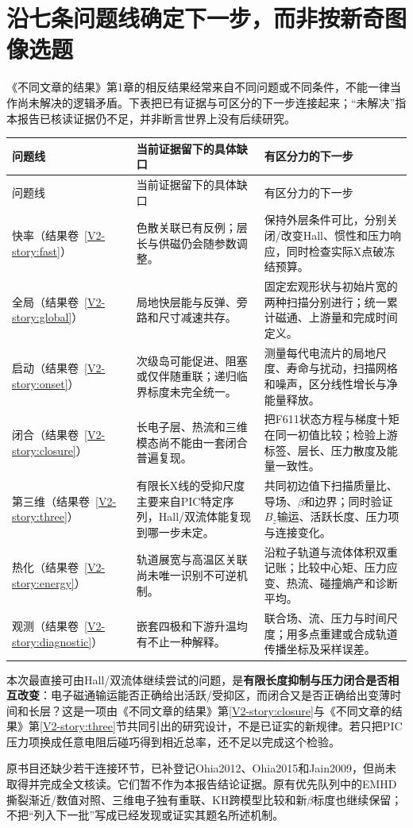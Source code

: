 \documentclass[UTF8,a4paper,11pt,openany,fontset=fandol]{ctexbook}
\begin{document}
\section{沿七条问题线确定下一步，而非按新奇图像选题}
《不同文章的结果》第1章的相反结果经常来自不同问题或不同条件，不能一律当作尚未解决的逻辑矛盾。下表把已有证据与可区分的下一步连接起来；“未解决”指本报告已核读证据仍不足，并非断言世界上没有后续研究。
\begin{longtable}{P{25mm}P{55mm}P{66mm}}
\toprule 问题线 & 当前证据留下的具体缺口 & 有区分力的下一步\\\midrule\endfirsthead
\toprule 问题线 & 当前证据留下的具体缺口 & 有区分力的下一步\\\midrule\endhead
快率（结果卷~\ref{V2-story:fast}） &
色散关联已有反例；层长与供磁仍会随参数调整。 &
保持外层条件可比，分别关闭/改变Hall、惯性和压力响应，同时检查实际X点破冻结预算。\\
全局（结果卷~\ref{V2-story:global}） &
局地快层能与反弹、旁路和尺寸减速共存。 &
固定宏观形状与初始片宽的两种扫描分别进行；统一累计磁通、上游量和完成时间定义。\\
启动（结果卷~\ref{V2-story:onset}） &
次级岛可能促进、阻塞或仅伴随重联；递归临界标度未完全统一。 &
测量每代电流片的局地尺度、寿命与扰动，扫描网格和噪声，区分线性增长与净能量释放。\\
闭合（结果卷~\ref{V2-story:closure}） &
长电子层、热流和三维模态尚不能由一套闭合普遍复现。 &
把F611状态方程与梯度十矩在同一初值比较；检验上游标签、层长、压力散度及能量一致性。\\
第三维（结果卷~\ref{V2-story:three}） &
有限长X线的受抑尺度主要来自PIC特定序列，Hall/双流体能复现到哪一步未定。 &
共同初边值下扫描质量比、导场、$\beta$和边界；同时验证$B_z$输运、活跃长度、压力项与连接变化。\\
热化（结果卷~\ref{V2-story:energy}） &
轨道展宽与高温区关联尚未唯一识别不可逆机制。 &
沿粒子轨道与流体体积双重记账；比较中心矩、压力应变、热流、碰撞熵产和诊断平均。\\
观测（结果卷~\ref{V2-story:diagnostic}） &
嵌套四极和下游升温均有不止一种解释。 &
联合场、流、压力与时间尺度；用多点重建或合成轨道传播坐标及采样误差。\\
\bottomrule
\end{longtable}

本次最直接可由Hall/双流体继续尝试的问题，是\textbf{有限长度抑制与压力闭合是否相互改变}：电子磁通输运能否正确给出活跃/受抑区，而闭合又是否正确给出变薄时间和长层？这是一项由《不同文章的结果》第\ref{V2-story:closure}与《不同文章的结果》第\ref{V2-story:three}节共同引出的研究设计，不是已证实的新规律。若只把PIC压力项换成任意电阻后碰巧得到相近总率，还不足以完成这个检验。\citep{F611,F659,F792}

原书目还缺少若干连接环节，已补登记Ohia2012、Ohia2015和Jain2009，但尚未取得并完成全文核读。它们暂不作为本报告结论证据。原有优先队列中的EMHD撕裂渐近/数值对照、三维电子独有重联、KH跨模型比较和新$\beta$标度也继续保留；不把“列入下一批”写成已经发现或证实其题名所述机制。

\backmatter
\end{document}
